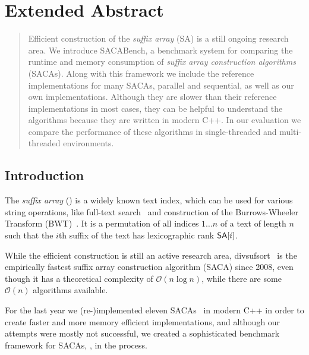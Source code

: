 \chapter{Extended Abstract}


{
\newtheorem*{abstract}{Abstract}

\begin{abstract}
    Efficient construction of the \emph{suffix array} (SA) is a still ongoing research area.
    We introduce SACABench, a benchmark system for comparing the runtime
    and memory consumption of \emph{suffix array construction algorithms} (SACAs).
    Along with this framework we include the reference implementations for many SACAs,
    parallel and sequential, as well as our own implementations.
    Although they are slower than their reference implementations in most cases,
    they can be helpful to understand the algorithms because they are written in modern C++.
    In our evaluation we compare the performance of these algorithms
    in single-threaded and multi-threaded environments.
\end{abstract}
}

\section{Introduction}

The  \emph{suffix array} (\emph{\sa}) is a widely known text index,
which can be used for various string operations,
like full-text search~\cite{makinen} and construction of the Burrows-Wheeler Transform (BWT)~\cite{BWT}.
It is a permutation of all indices $1 \dots n$ of a text of length $n$ such
that the $i$th suffix of the text  has lexicographic rank $\sa[i]$.

While the efficient construction is still an active research area,
divsufsort~\cite{saca:5,saca:5:repo} is the empirically fastest
suffix array construction algorithm (SACA) since 2008,
even though it has a theoretical complexity of $\mathcal O (n \log n)$,
while there are some $\mathcal O(n)$ algorithms available.

For the last year we (re-)implemented eleven SACAs~\cite{saca:3,saca:11,saca:5,saca:9,saca:1,saca:8,saca:4,saca:7,saca:10,saca:6,saca:2}
in modern C++ in order to create faster and more memory efficient implementations,
and although our attempts were mostly not successful,
we created a sophisticated benchmark framework for SACAs, \emph{\sacabench}, in the process.

